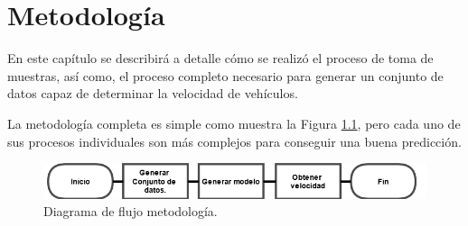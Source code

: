 \chapter{Metodología}

En este capítulo se describirá a detalle cómo se realizó el proceso de toma de muestras, así como, el proceso completo necesario para generar un conjunto de datos capaz de determinar la velocidad de vehículos.

La metodología completa es simple como muestra la Figura \ref{fig:MetodologiaDF}, pero cada uno de sus procesos individuales son más complejos para conseguir una buena predicción.

\begin{figure}[H]
    \centering
    \includegraphics[width=1\textwidth]{Metodologia/imgs/MetodologiaDF.png}
    \caption{Diagrama de flujo metodología.}
    \label{fig:MetodologiaDF}
\end{figure}




